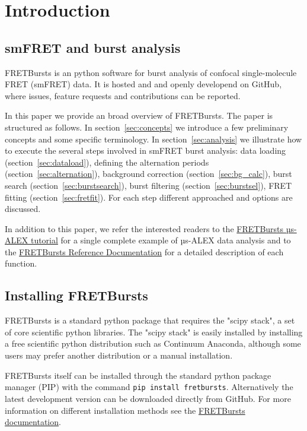 \section{Introduction}

\subsection{smFRET and burst analysis}

FRETBursts is an python software for burst analysis of confocal single-molecule
FRET (smFRET) data. It is hosted and and openly developend on GitHub, where
issues, feature requests and contributions can be reported.

In this paper we provide an broad overview of FRETBursts. The 
paper is structured as follows. In section~\ref{sec:concepts} we
introduce a few preliminary concepts and some specific terminology.
In section~\ref{sec:analysis} we illustrate how to execute the several steps involved
in smFRET burst analysis: data loading (section~\ref{sec:dataload}), defining the 
alternation periods (section~\ref{sec:alternation}), background 
correction (section~\ref{sec:bg_calc}), burst search (section~\ref{sec:burstsearch}), 
burst filtering (section~\ref{sec:burstsel}), FRET fitting (section~\ref{sec:fretfit}). 
For each step different approached and options are discussed.

In addition to this paper, we refer the interested readers to the 
\href{http://nbviewer.ipython.org/github/tritemio/FRETBursts_notebooks/blob/master/notebooks/FRETBursts\%20-\%20us-ALEX\%20smFRET\%20burst\%20analysis.ipynb}{FRETBursts µs-ALEX tutorial} 
for a single complete example of µs-ALEX data analysis and to the
\href{http://fretbursts.readthedocs.org/}{FRETBursts Reference Documentation}
for a detailed description of each function.

\subsection{Installing FRETBursts}
FRETBursts is a standard python package that requires the "scipy stack", a set
of core scientific python libraries.
The "scipy stack" is easily installed by installing a free scientific python
distribution such as Continuum Anaconda, although some users may prefer another
distribution or a manual installation.

FRETBursts itself can be installed through the standard python package manager (PIP)
with the command \texttt{pip install fretbursts}. 
Alternatively the latest development version can be downloaded directly 
from GitHub. For more information on different installation methods see the
\href{http://fretbursts.readthedocs.org/en/latest/installation.html}{FRETBursts
documentation}.

